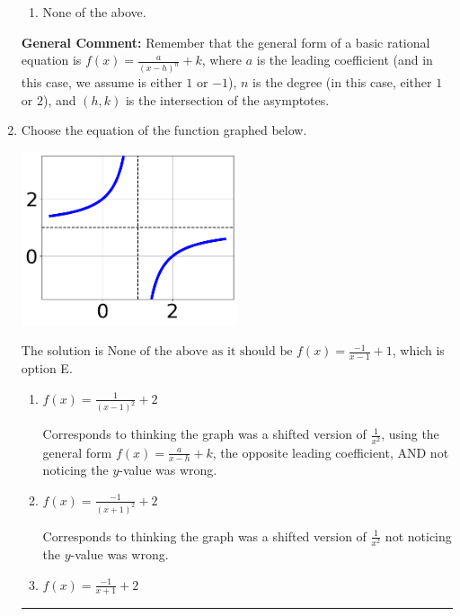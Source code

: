 \documentclass{extbook}[14pt]
\newcommand{\litem}[1]{\item #1

\rule{\textwidth}{0.4pt}}
\begin{document}
\begin{enumerate}
{\begin{enumerate}[label=\Alph*.]
\item None of the above.\end{enumerate}
\textbf{General Comment:} Remember that the general form of a basic rational equation is $ f(x) = \frac{a}{(x-h)^n} + k$, where $a$ is the leading coefficient (and in this case, we assume is either $1$ or $-1$), $n$ is the degree (in this case, either $1$ or $2$), and $(h, k)$ is the intersection of the asymptotes.
}
\litem{
Choose the equation of the function graphed below.

\begin{center}
    \includegraphics[width=0.5\textwidth]{../Figures/rationalGraphToEquationB.png}
\end{center}


The solution is \( \text{None of the above as it should be } f(x) = \frac{-1}{x - 1} + 1 \), which is option E.\begin{enumerate}[label=\Alph*.]
\item \( f(x) = \frac{1}{(x - 1)^2} + 2 \)

Corresponds to thinking the graph was a shifted version of $\frac{1}{x^2}$, using the general form $f(x) = \frac{a}{x-h}+k$, the opposite leading coefficient, AND not noticing the $y$-value was wrong.
\item \( f(x) = \frac{-1}{(x + 1)^2} + 2 \)

Corresponds to thinking the graph was a shifted version of $\frac{1}{x^2}$ not noticing the $y$-value was wrong.
\item \( f(x) = \frac{-1}{x + 1} + 2 \)


\end{enumerate}}
\end{enumerate}
\end{document}
